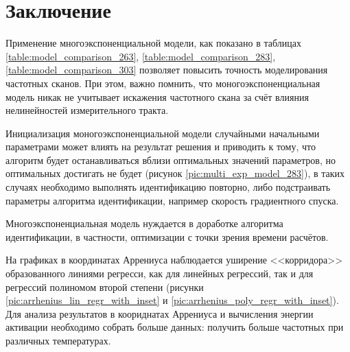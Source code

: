 \section{Заключение}

Применение многоэкспоненциальной модели, как показано в таблицах 
\ref{table:model_comparison_263}, \ref{table:model_comparison_283},
\ref{table:model_comparison_303} позволяет повысить точность моделирования
частотных сканов. При этом, важно помнить, что моногоэкспоненциальная модель
никак не учитывает искажения частотного скана за счёт влияния нелинейностей
измерительного тракта.

Инициализация моногоэкспоненциальной модели случайными начальными параметрами
может влиять на результат решения и приводить к тому, что алгоритм будет
останавливаться вблизи оптимальных значений параметров, но оптимальных достигать
не будет (рисунок \ref{pic:multi_exp_model_283}), в таких случаях необходимо
выполнять идентификацию повторно, либо подстраивать параметры алгоритма 
идентификации, например скорость градиентного спуска.

Многоэкспоненциальная модель нуждается в доработке алгоритма идентификации,
в частности, оптимизации с точки зрения времени расчётов.

На графиках в координатах Аррениуса наблюдается уширение <<корридора>> 
образованного линиями регресси, как для линейных регрессий, так и для 
регрессий полиномом второй степени (рисунки 
\ref{pic:arrhenius_lin_regr_with_inset} и 
\ref{pic:arrhenius_poly_regr_with_inset}). Для анализа результатов в 
коориднатах Аррениуса и вычисления энергии активации необходимо собрать больше 
данных: получить больше частотных при различных температурах.